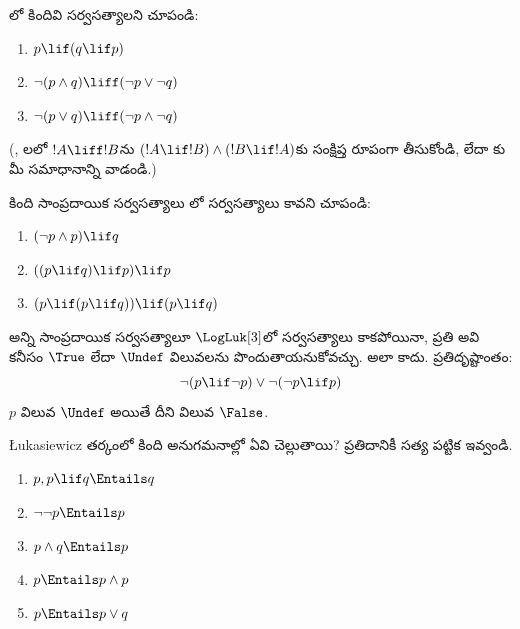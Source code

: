 \documentclass[../../../include/open-logic-section]{subfiles}
\begin{document}
\begin{prob}
  \LogLuk[3]లో కిందివి సర్వసత్యాలని చూపండి:
  \begin{enumerate}
    \item $p \lif (q \lif p)$
    \item\label{mvl:thr:luk:prob:luk-taut-2} $\lnot(p \land q) \liff (\lnot p \lor \lnot q)$
    \item\label{mvl:thr:luk:prob:luk-taut-3} $\lnot(p \lor q) \liff (\lnot p \land \lnot q)$
  \end{enumerate}
  (,
  లలో
  $!A \liff !B$ను $(!A \lif !B) \land (!B \lif !A)$కు
  సంక్షిప్త రూపంగా తీసుకోండి, లేదా
  కు మీ సమాధానాన్ని వాడండి.)
\end{prob}

\begin{prob}
  కింది సాంప్రదాయిక సర్వసత్యాలు \LogLuk[3]లో
  సర్వసత్యాలు కావని చూపండి:
  \begin{enumerate}
    \item $(\lnot p \land p) \lif q$
    \item $((p \lif q) \lif p) \lif p$
    \item $(p \lif (p \lif q)) \lif (p \lif q)$
  \end{enumerate}
\end{prob}

అన్ని సాంప్రదాయిక సర్వసత్యాలూ $\LogLuk[3]$లో
సర్వసత్యాలు కాకపోయినా, ప్రతి
అవి కనీసం $\True$ లేదా $\Undef$ విలువలను
పొందుతాయనుకోవచ్చు. అలా కాదు. ప్రతిదృష్టాంతం:
\[
  \lnot(p \lif \lnot p) \lor \lnot(\lnot p \lif p)
\]
$p$ విలువ $\Undef$ అయితే దీని విలువ $\False$.

\begin{prob}
  \L ukasiewicz తర్కంలో కింది అనుగమనాల్లో ఏవి
  చెల్లుతాయి? ప్రతిదానికీ సత్య పట్టిక ఇవ్వండి.
  \begin{enumerate}
    \item $p, p \lif q \Entails q$
    \item $\lnot\lnot p \Entails p$
    \item $p \land q \Entails p$
    \item $p \Entails p \land p$
    \item $p \Entails p \lor q$
  \end{enumerate}
\end{prob}
\end{document}
